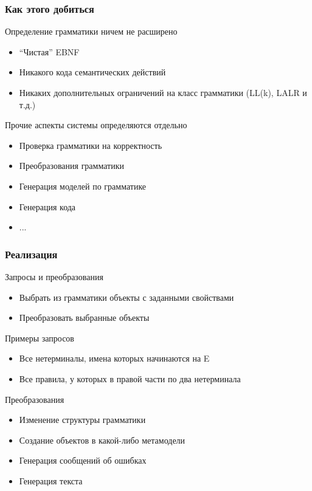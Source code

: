 \documentclass[paper=screen,10pt,unicode]{beamer}
\begin{document}
\begin{frame}
	\frametitle{Как этого добиться}

	\begin{block}{Определение грамматики ничем не расширено}
		\begin{itemize}
			\item ``Чистая'' EBNF
			\item Никакого кода семантических действий
			\item Никаких дополнительных ограничений на класс грамматики (LL(k), LALR и т.д.)
		\end{itemize}
	\end{block}
	\begin{block}{Прочие аспекты системы определяются отдельно}
		\begin{itemize}
			\item Проверка грамматики на корректность
			\item Преобразования грамматики
			\item Генерация моделей по грамматике
			\item Генерация кода
			\item ...
		\end{itemize}
	\end{block}
\end{frame}

\begin{frame}
	\frametitle{Реализация}
	\begin{block}{Запросы и преобразования}
		\begin{itemize}
			\item Выбрать из грамматики объекты с заданными свойствами
			\item Преобразовать выбранные объекты
		\end{itemize}
	\end{block}
	\begin{block}{}
		Примеры запросов
		\begin{itemize}
			\item Все нетерминалы, имена которых начинаются на E
			\item Все правила, у которых в правой части по два нетерминала
		\end{itemize}
	\end{block}
	\begin{block}{Преобразования}
		\begin{itemize}
			\item Изменение структуры грамматики
			\item Создание объектов в какой-либо метамодели
			\item Генерация сообщений об ошибках
			\item Генерация текста
		\end{itemize}
	\end{block}
\end{frame}
\end{document}

